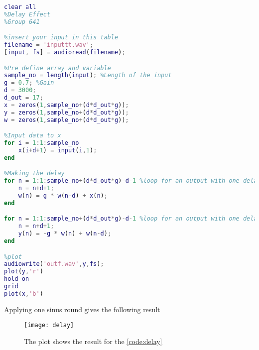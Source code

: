 \begin{lstlisting}[language=Matlab, caption= Matlab code for delay effect]
clear all
%Delay Effect
%Group 641

%insert your input in this table
filename = 'inputtt.wav';
[input, fs] = audioread(filename);

%Pre define array and variable
sample_no = length(input); %Length of the input
g = 0.7; %Gain
d = 3000;
d_out = 17;
x = zeros(1,sample_no+(d*d_out*g));
y = zeros(1,sample_no+(d*d_out*g));
w = zeros(1,sample_no+(d*d_out*g));

%Input data to x
for i = 1:1:sample_no
    x(i+d+1) = input(i,1);
end

%Making the delay
for n = 1:1:sample_no+(d*d_out*g)-d-1 %loop for an output with one delay value
    n = n+d+1;   
    w(n) = g * w(n-d) + x(n);
end

for n = 1:1:sample_no+(d*d_out*g)-d-1 %loop for an output with one delay value
    n = n+d+1;   
    y(n) = -g * w(n) + w(n-d);
end

%plot
audiowrite('outf.wav',y,fs);
plot(y,'r')
hold on
grid
plot(x,'b')
\end{lstlisting}\label{code:delay}



Applying one sinus round gives the following result

\begin{figure}[htbp]
	\centering
	\texttt{[image: delay]}
	\caption{The plot shows the result for the \autoref{code:delay}}
	\label{fig:delay_plot}
\end{figure}